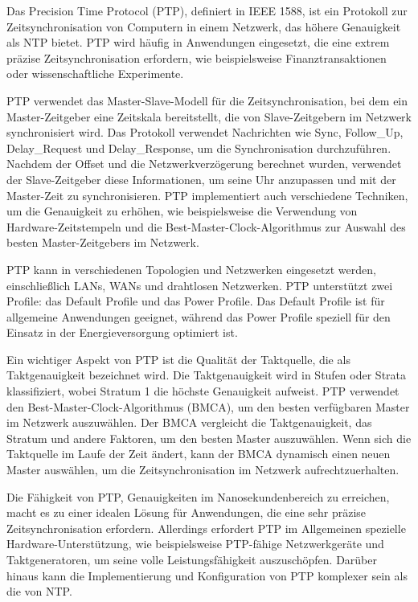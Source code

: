 Das Precision Time Protocol (PTP), definiert in IEEE 1588, ist ein Protokoll zur Zeitsynchronisation von Computern in einem Netzwerk, das höhere Genauigkeit als NTP bietet. PTP wird häufig in Anwendungen eingesetzt, die eine extrem präzise Zeitsynchronisation erfordern, wie beispielsweise Finanztransaktionen oder wissenschaftliche Experimente.

PTP verwendet das Master-Slave-Modell für die Zeitsynchronisation, bei dem ein Master-Zeitgeber eine Zeitskala bereitstellt, die von Slave-Zeitgebern im Netzwerk synchronisiert wird. Das Protokoll verwendet Nachrichten wie Sync, Follow\_Up, Delay\_Request und Delay\_Response, um die Synchronisation durchzuführen.
Nachdem der Offset und die Netzwerkverzögerung berechnet wurden, verwendet der Slave-Zeitgeber diese Informationen, um seine Uhr anzupassen und mit der Master-Zeit zu synchronisieren. PTP implementiert auch verschiedene Techniken, um die Genauigkeit zu erhöhen, wie beispielsweise die Verwendung von Hardware-Zeitstempeln und die Best-Master-Clock-Algorithmus zur Auswahl des besten Master-Zeitgebers im Netzwerk.

PTP kann in verschiedenen Topologien und Netzwerken eingesetzt werden, einschließlich LANs, WANs und drahtlosen Netzwerken. PTP unterstützt zwei Profile: das Default Profile und das Power Profile. Das Default Profile ist für allgemeine Anwendungen geeignet, während das Power Profile speziell für den Einsatz in der Energieversorgung optimiert ist.

Ein wichtiger Aspekt von PTP ist die Qualität der Taktquelle, die als Taktgenauigkeit bezeichnet wird. Die Taktgenauigkeit wird in Stufen oder Strata klassifiziert, wobei Stratum 1 die höchste Genauigkeit aufweist. PTP verwendet den Best-Master-Clock-Algorithmus (BMCA), um den besten verfügbaren Master im Netzwerk auszuwählen. Der BMCA vergleicht die Taktgenauigkeit, das Stratum und andere Faktoren, um den besten Master auszuwählen. Wenn sich die Taktquelle im Laufe der Zeit ändert, kann der BMCA dynamisch einen neuen Master auswählen, um die Zeitsynchronisation im Netzwerk aufrechtzuerhalten.

Die Fähigkeit von PTP, Genauigkeiten im Nanosekundenbereich zu erreichen, macht es zu einer idealen Lösung für Anwendungen, die eine sehr präzise Zeitsynchronisation erfordern. Allerdings erfordert PTP im Allgemeinen spezielle Hardware-Unterstützung, wie beispielsweise PTP-fähige Netzwerkgeräte und Taktgeneratoren, um seine volle Leistungsfähigkeit auszuschöpfen. Darüber hinaus kann die Implementierung und Konfiguration von PTP komplexer sein als die von NTP.

